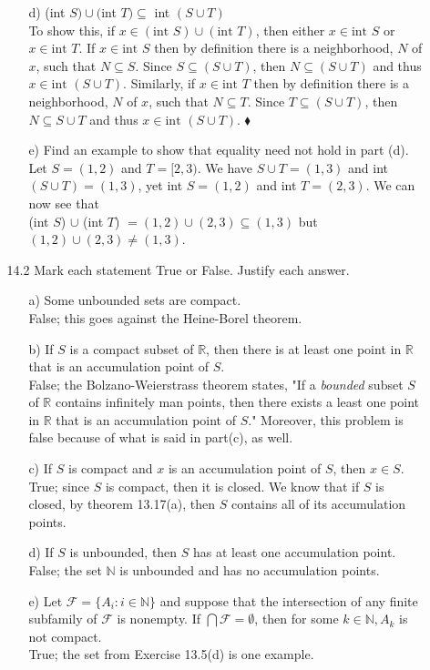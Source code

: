 \documentclass[12pt]{article}
\begin{document}
\begin{enumerate}
\begin{enumerate}
\begin{enumerate}
\item[d)] (int $S) \cup ($int $T) \subseteq$ int $(S \cup T)$ \\
To show this, if $x \in (\mbox{int }S) \cup (\mbox{int } T)$, then either 
$x \in \mbox{int } S$ or $x \in \mbox{int }T$. If $x \in \mbox{int } S$ then by definition
there is a neighborhood, $N$ of $x$, such that $N \subseteq S$. Since $S \subseteq (S \cup T)$, then $N \subseteq (S \cup T)$ and thus $x \in \mbox{int } (S \cup T)$. Similarly, if $x \in \mbox{int } T$ then by definition there is a neighborhood, $N$ of $x$, such that $N \subseteq T$. 
Since $T \subseteq (S \cup T)$, then $N \subseteq S \cup T$ and thus $x \in \mbox{int }(S \cup T)$.
$\blacklozenge$
\item[e)] Find an example to show that equality need not hold in part (d). \\
Let $S = (1, 2)$ and $T = [2, 3)$. We have $S \cup T = (1, 3)$ and int $(S \cup T) = (1, 3)$, 
yet int $S = (1, 2)$ and int $T = (2, 3)$. We can now see that \\
(int $S$) $\cup$ (int $T$) $= (1, 2)\cup (2, 3) \subseteq (1, 3)$ but $(1, 2)\cup (2, 3) \neq (1, 3)$.
\end{enumerate}

\item[14.2] Mark each statement True or False. Justify each answer.
\begin{enumerate}
\item[a)] Some unbounded sets are compact.\\
False; this goes against the Heine-Borel theorem.
\item[b)] If $S$ is a compact subset of $\mathbb{R}$, then there is at least one point in $\mathbb{R}$ that is an accumulation point of $S$. \\
False; the Bolzano-Weierstrass theorem states, "If a \emph{bounded} subset $S$ of
$\mathbb{R}$ contains infinitely man points, then there exists a least one point in
$\mathbb{R}$ that is an accumulation point of $S$." Moreover, this problem is false because
of what is said in part(c), as well. 
\item[c)] If $S$ is compact and $x$ is an accumulation point of $S$, then $x \in S$. \\
True; since $S$ is compact, then it is closed. We know that if $S$ is closed, by 
theorem 13.17(a), then $S$ contains all of its accumulation points. 
\item[d)] If $S$ is unbounded, then $S$ has at least one accumulation point. \\
False; the set $\mathbb{N}$ is unbounded and has no accumulation points.
\item[e)] Let $\mathcal{F} = \{ A_i : i \in \mathbb{N} \}$ and suppose that the intersection of any finite subfamily of $\mathcal{F}$ is nonempty. If $\bigcap \mathcal{F} = \emptyset$, then for some $k \in \mathbb{N}, A_k$ is not compact. \\
True; the set from Exercise 13.5(d) is one example.
\end{enumerate}


\end{enumerate}
\end{enumerate}
\end{document}

